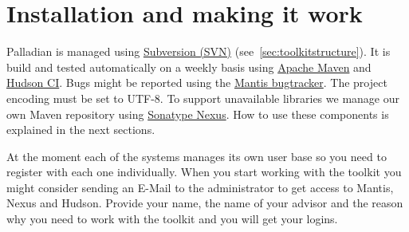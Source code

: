 \documentclass[a4paper,twoside]{book}      %
\begin{document}
\chapter{Installation and making it work}
Palladian is managed using \href{http://subversion.apache.org/}{Subversion (SVN)} (see~\ref{sec:toolkitstructure}). It is build and tested automatically on a weekly basis using \href{http://maven.apache.org/}{Apache Maven} and \href{http://hudson-ci.org/}{Hudson CI}. Bugs might be reported using the \href{http://www.mantisbt.org/}{Mantis bugtracker}. The project encoding must be set to UTF-8. To support unavailable libraries we manage our own Maven repository using \href{http://nexus.sonatype.org/}{Sonatype Nexus}. How to use these components is explained in the next sections.

At the moment each of the systems manages its own user base so you need to register with each one individually. When you start working with the toolkit you might consider sending an E-Mail to the administrator to get access to Mantis, Nexus and Hudson. Provide your name, the name of your advisor and the reason why you need to work with the toolkit and you will get your logins.
\end{document}
